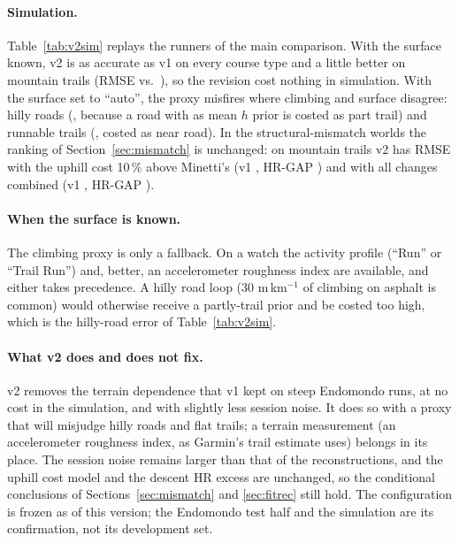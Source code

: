 \documentclass[11pt,a4paper]{article}
\newcommand{\unit}{ml\,kg$^{-1}$\,min$^{-1}$}
\newcommand{\ascent}{ASCENT}
\begin{document}
\paragraph{Simulation.} Table~\ref{tab:v2sim} replays the \nnRunnersMain{} runners of the main comparison. With the surface known, v2 is as accurate as v1 on every course type and a little better on mountain trails (RMSE \nvsimRmountainTwo{} vs.\ \nvsimRmountainOne), so the revision cost nothing in simulation. With the surface set to ``auto'', the proxy misfires where climbing and surface disagree: hilly roads (\nvsimroadhillyTwoAuto, because a road with \nvsimHauto{} as mean $h$ prior is costed as part trail) and runnable trails (\nvsimtrailrunnableTwoAuto, costed as near road). In the structural-mismatch worlds the ranking of Section~\ref{sec:mismatch} is unchanged: on mountain trails v2 has RMSE \nvmmRTiltUpmountainTwo{} with the uphill cost 10\,\% above Minetti's (v1 \nvmmRTiltUpmountainOne, HR-GAP \nvmmRTiltUpmountainGhrgap) and \nvmmRAllMismountainTwo{} with all changes combined (v1 \nvmmRAllMismountainOne, HR-GAP \nvmmRAllMismountainGhrgap).

\begin{table}[!htbp]\centering\small
\caption{Simulation replay (\nnRunnersMain{} runners, training and races pooled): mean error [RMSE] in \unit{} of the HR-calibrated GAP reconstruction, \ascent{} v1, \ascent{} v2 with the known surface class and v2 with the surface set to ``auto''.}\label{tab:v2sim}

\end{table}

\paragraph{When the surface is known.} The climbing proxy is only a fallback. On a watch the activity profile (``Run'' or ``Trail Run'') and, better, an accelerometer roughness index are available, and either takes precedence. A hilly road loop (30 m\,km$^{-1}$ of climbing on asphalt is common) would otherwise receive a partly-trail prior and be costed too high, which is the hilly-road error of Table~\ref{tab:v2sim}.

\paragraph{What v2 does and does not fix.} v2 removes the terrain dependence that v1 kept on steep Endomondo runs, at no cost in the simulation, and with slightly less session noise. It does so with a proxy that will misjudge hilly roads and flat trails; a terrain measurement (an accelerometer roughness index, as Garmin's trail estimate uses) belongs in its place. The session noise remains larger than that of the reconstructions, and the uphill cost model and the descent HR excess are unchanged, so the conditional conclusions of Sections~\ref{sec:mismatch} and \ref{sec:fitrec} still hold. The configuration is frozen as of this version; the Endomondo test half and the simulation are its confirmation, not its development set.
\end{document}
